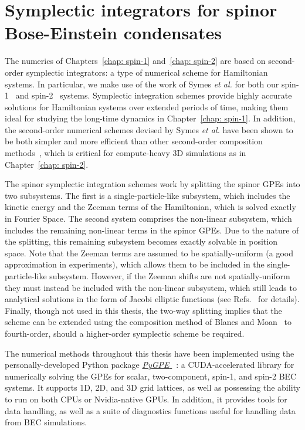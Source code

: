 \section{\label{sec: symplectic-integrators}Symplectic integrators for spinor
Bose-Einstein condensates}
The numerics of Chapters~\ref{chap: spin-1} and~\ref{chap: spin-2} are based on
second-order symplectic integrators: a type of numerical scheme for Hamiltonian
systems.
In particular, we make use of the work of Symes \textit{et al.} for both our
spin-1~\cite{Symes2016} and spin-2~\cite{Symes2017a} systems.
Symplectic integration schemes provide highly accurate solutions for Hamiltonian
systems over extended periods of time, making them ideal for studying the
long-time dynamics in Chapter~\ref{chap: spin-1}.
In addition, the second-order numerical schemes devised by Symes \textit{et al.}
have been shown to be both simpler and more efficient than other second-order
composition methods~\cite{Wang2007}, which is critical for compute-heavy 3D
simulations as in Chapter~\ref{chap: spin-2}.

The spinor symplectic integration schemes work by splitting the spinor GPEs into
two subsystems.
The first is a single-particle-like subsystem, which includes the kinetic energy
and the Zeeman terms of the Hamiltonian, which is solved exactly in Fourier
Space.
The second system comprises the non-linear subsystem, which includes the
remaining non-linear terms in the spinor GPEs.
Due to the nature of the splitting, this remaining subsystem becomes exactly
solvable in position space.
Note that the Zeeman terms are assumed to be spatially-uniform (a good
approximation in experiments), which allows them to be included in the
single-particle-like subsystem.
However, if the Zeeman shifts are not spatially-uniform they must instead be
included with the non-linear subsystem, which still leads to analytical
solutions in the form of Jacobi elliptic functions (see
Refs.~\cite{Symes2016, Symes2017a} for details).
Finally, though not used in this thesis, the two-way splitting implies that
the scheme can be extended using the composition method of Blanes and
Moan~\cite{Blanes2002} to fourth-order, should a higher-order symplectic scheme
be required.

The numerical methods throughout this thesis have been implemented using the
personally-developed Python package
\href{https://github.com/wheelerMT/pygpe}{
    \textit{PyGPE}
}~\cite{Wheeler_PyGPE_2024}: a CUDA-accelerated library for numerically solving
the GPEs for scalar, two-component, spin-1, and spin-2 BEC systems.
It supports 1D, 2D, and 3D grid lattices, as well as possessing the ability to
run on both CPUs or Nvidia-native GPUs.
In addition, it provides tools for data handling, as well as a suite of
diagnostics functions useful for handling data from BEC simulations.
